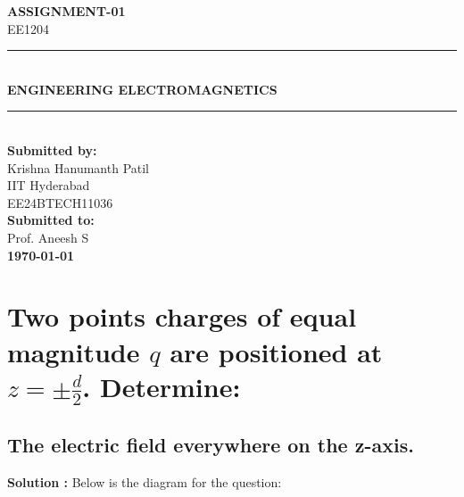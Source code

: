 \documentclass[a4paper,12pt]{article}
\begin{document}
\begin{titlepage}
    \centering
    {\Huge \textbf{ASSIGNMENT-01}}\\[1cm]
    {\Large EE1204}\\[1.5cm]
    \rule{\linewidth}{0.5mm} \\[0.4cm]
    {\Huge \textbf{ENGINEERING ELECTROMAGNETICS}}\\[0.4cm]
    \rule{\linewidth}{0.5mm} \\[1.5cm]
    
    \textbf{Submitted by:}\\
    {Krishna Hanumanth Patil}\\
    {IIT Hyderabad}\\
    {EE24BTECH11036}\\[1cm]
    \textbf{Submitted to:}\\
    {Prof. Aneesh S}\\[1.5cm]
    
    \vfill
    \textbf{\today}\\
    \vfill
\end{titlepage}

\section{Two points charges of equal magnitude $q$ are positioned at $z=\pm \frac{d}{2}$. Determine:}
\subsection{The electric field everywhere on the z-axis.}
\textbf{Solution :} Below is the diagram for the question:
\end{document}
